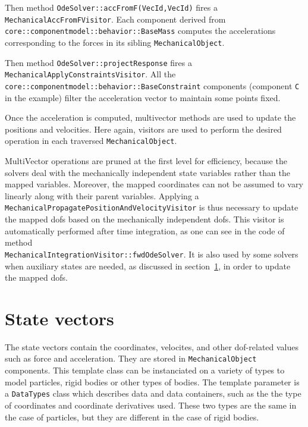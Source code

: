 Then method \texttt{OdeSolver::accFromF(VecId,VecId)} fires a \texttt{MechanicalAccFromFVisitor}. Each component derived from \texttt{core::componentmodel::behavior::BaseMass} computes the accelerations corresponding to the forces in its sibling \texttt{MechanicalObject}.

Then method \texttt{OdeSolver::projectResponse} fires a \texttt{MechanicalApplyConstraintsVisitor}. All the \texttt{core::componentmodel::behavior::BaseConstraint} components (component \texttt{C} in the example) filter the acceleration vector to maintain some points fixed.

Once the acceleration is computed, multivector methods are used to update the positions and velocities. Here again, visitors are used to perform the desired operation in each traversed \texttt{MechanicalObject}.

MultiVector operations are pruned at the first level for efficiency, because the solvers deal with the mechanically independent state variables rather than the mapped variables. 
Moreover, the mapped coordinates can not be assumed to vary linearly along with their parent variables.
Applying a \texttt{MechanicalPropagatePositionAndVelocityVisitor} is thus necessary to update the mapped dofs based on the mechanically independent dofs. 
This visitor is automatically performed after time integration, as one can see in the code of method \\ \texttt{MechanicalIntegrationVisitor::fwdOdeSolver}.
It is also used by some solvers when auxiliary states are needed, as discussed in section~\ref{sec:statevectors}, in order to update the mapped dofs.



\section{State vectors} \label{sec:statevectors}
The state vectors contain the coordinates, velocites, and other dof-related values such as force and acceleration.
They are stored in \texttt{MechanicalObject} components. 
This template class can be instanciated on a variety of types to model particles, rigid bodies or other types of bodies. 
The template parameter is a \texttt{DataTypes} class which describes data and data containers, such as the the type of coordinates and coordinate derivatives used. 
These two types are the same in the case of particles, but they are different in the case of rigid bodies.

